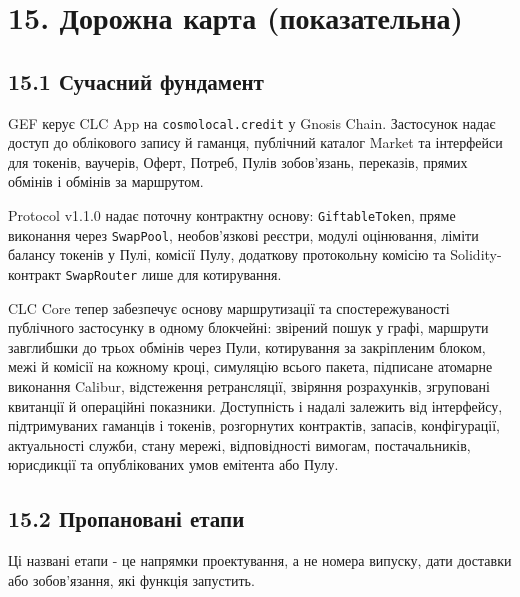 \documentclass[11pt]{article}
\begin{document}
\section*{15. Дорожна карта (показательна)}

\subsection*{15.1 Сучасний фундамент}

GEF керує CLC App на \texttt{cosmolocal.credit} у Gnosis Chain. Застосунок надає доступ до облікового запису й гаманця, публічний каталог Market та інтерфейси для токенів, ваучерів, Оферт, Потреб, Пулів зобов'язань, переказів, прямих обмінів і обмінів за маршрутом.

Protocol v1.1.0 надає поточну контрактну основу: \texttt{GiftableToken}, пряме виконання через \texttt{SwapPool}, необов'язкові реєстри, модулі оцінювання, ліміти балансу токенів у Пулі, комісії Пулу, додаткову протокольну комісію та Solidity-контракт \texttt{SwapRouter} лише для котирування.

CLC Core тепер забезпечує основу маршрутизації та спостережуваності публічного застосунку в одному блокчейні: звірений пошук у графі, маршрути завглибшки до трьох обмінів через Пули, котирування за закріпленим блоком, межі й комісії на кожному кроці, симуляцію всього пакета, підписане атомарне виконання Calibur, відстеження ретрансляції, звіряння розрахунків, згруповані квитанції й операційні показники. Доступність і надалі залежить від інтерфейсу, підтримуваних гаманців і токенів, розгорнутих контрактів, запасів, конфігурації, актуальності служби, стану мережі, відповідності вимогам, постачальників, юрисдикції та опублікованих умов емітента або Пулу.

\subsection*{15.2 Пропановані етапи}

Ці названі етапи - це напрямки проектування, а не номера випуску, дати доставки або зобов'язання, які функція запустить.
\end{document}
